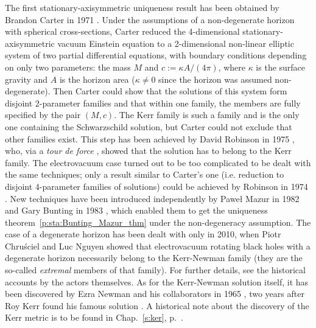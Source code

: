 \begin{hist}
\label{h:sta:axisym_uniqueness}
The first stationary-axisymmetric uniqueness result has been obtained
by Brandon Carter in 1971 \cite{Carte71}. Under the
assumptions of a non-degenerate horizon with spherical cross-sections,
Carter reduced the 4-dimensional stationary-axisymmetric
vacuum Einstein equation to a 2-dimensional non-linear elliptic system
of two partial differential equations,
with boundary conditions depending on only two parameters: the mass $M$
and $c := \kappa A/(4\pi)$, where $\kappa$ is the surface gravity and $A$
is the horizon area ($\kappa \neq 0$ since the horizon was assumed non-degenerate).
Then Carter could show that the solutions
of this system form disjoint 2-parameter families and that within one family,
the members are fully specified by the pair $(M, c)$. The Kerr family is
such a family and is the only one containing the Schwarzschild solution, but
Carter could not exclude that other families exist. This step has been achieved
by David Robinson in 1975 \cite{Robin75}, who,
via a \emph{tour de force} \cite{Carte99}, showed
that the solution has to belong to the Kerr family.
The electrovacuum case turned out to be too complicated
to be dealt with the same techniques; only a result similar to Carter's
one (i.e. reduction to disjoint 4-parameter families of solutions)
could be achieved by Robinson in 1974 \cite{Robin74}.
New techniques have been introduced independently
by Pawe\l{} Mazur in 1982 \cite{Mazur82} and
Gary Bunting in 1983 \cite{Bunti83}, which enabled
them to get the uniqueness theorem~\ref{p:sta:Bunting_Mazur_thm}
under the non-degeneracy assumption. The case of a degenerate horizon
has been dealt with only in 2010, when Piotr Chru\'sciel
and Luc Nguyen \cite{ChrusN10}
showed that electrovacuum rotating black holes with a degenerate horizon
necessarily belong to the Kerr-Newman family (they are the so-called
\emph{extremal} members of that family).
For further details, see the historical accounts \cite{Carte99,Mazur01,Robin09}
by the actors themselves. As for the Kerr-Newman solution itself, it has
been discovered by Ezra Newman and his collaborators in 1965 \cite{Newma_al65}, two years after Roy Kerr
found his famous solution \cite{Kerr63}. A historical note about the discovery of the Kerr metric is to be found in Chap.~\ref{s:ker}, p.~\pageref{h:ker:Kerr_sol}.
\end{hist}

